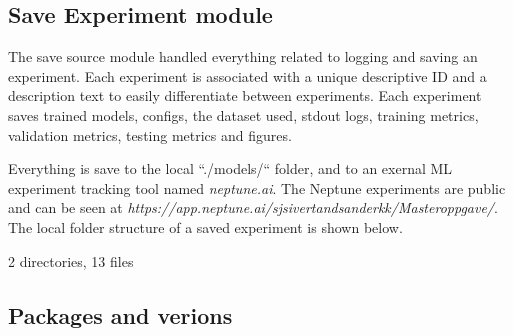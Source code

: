 \subsection{Save Experiment module}
\label{section:method:experiment-framework:save-experiment-module}

The save source module handled everything related to logging and saving an experiment.
Each experiment is associated with a unique descriptive ID and a description text to easily
differentiate between experiments.
Each experiment saves trained models, configs, the dataset used, stdout logs, training metrics, validation metrics,
testing metrics and figures.

Everything is save to the local ``./models/`` folder, and to an exernal ML experiment tracking tool
named \textit{neptune.ai}. The Neptune experiments are public and can be
seen at \textit{https://app.neptune.ai/sjsivertandsanderkk/Masteroppgave/}.
The local folder structure of a saved experiment is shown below.

2 directories, 13 files

\subsection{Packages and verions}

